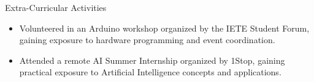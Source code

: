 \documentclass{resume} %
\begin{document}
\begin{rSection}{Extra-Curricular Activities}
\begin{itemize}
    \itemsep -7pt
    \item Volunteered in an Arduino workshop organized by the IETE Student Forum, gaining exposure to hardware programming and event coordination.
    \item Attended a remote AI Summer Internship organized by 1Stop, gaining practical exposure to Artificial Intelligence concepts and applications.
   

\end{itemize}
\end{rSection}
\end{document}
